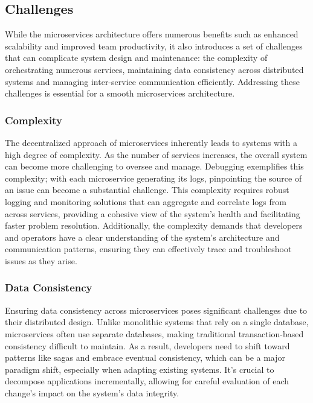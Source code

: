 \subsection{Challenges}
While the microservices architecture offers numerous benefits such as enhanced scalability and
improved team productivity, it also introduces a set of challenges that can complicate system design
and maintenance: the complexity of orchestrating numerous services, maintaining data consistency
across distributed systems and managing inter-service communication efficiently. Addressing these
challenges is essential for a smooth microservices architecture.

\subsubsection{Complexity}
The decentralized approach of microservices inherently leads to systems with a high degree of
complexity. As the number of services increases, the overall system can become more challenging to
oversee and manage. Debugging exemplifies this complexity; with each microservice generating its
logs, pinpointing the source of an issue can become a substantial challenge. This complexity
requires robust logging and monitoring solutions that can aggregate and correlate logs from across
services, providing a cohesive view of the system's health and facilitating faster problem
resolution. Additionally, the complexity demands that developers and operators have a clear
understanding of the system's architecture and communication patterns, ensuring they can effectively
trace and troubleshoot issues as they arise.

\subsubsection{Data Consistency}
Ensuring data consistency across microservices poses significant challenges due to their distributed
design. Unlike monolithic systems that rely on a single database, microservices often use separate
databases, making traditional transaction-based consistency difficult to maintain. As a result,
developers need to shift toward patterns like sagas and embrace eventual consistency, which can be a
major paradigm shift, especially when adapting existing systems. It's crucial to decompose
applications incrementally, allowing for careful evaluation of each change's impact on the system's
data integrity.

